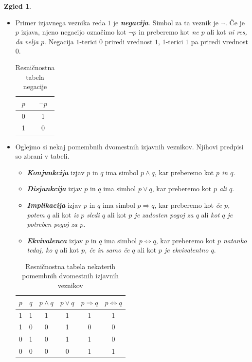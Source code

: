 \documentclass[11pt]{book}
\def\definicija{\color{rdeca}\bf\em}
\theoremstyle{definition}
\theoremstyle{zgled}
\newtheorem*{zgled}{Zgled}
\theoremstyle{odprtproblem}
\theoremstyle{domacanaloga}
\theoremstyle{izrek}
\begin{document}
\begin{zgled} \leavevmode
\begin{itemize}
    \item Primer izjavnega veznika reda $1$ je {\definicija negacija}. Simbol za ta veznik je $\lnot$. Če je $p$ izjava, njeno negacijo označimo kot $\lnot p$ in preberemo kot \emph{ne $p$} ali kot \emph{ni res, da velja $p$}. Negacija $1$-terici $0$ priredi vrednost $1$, $1$-terici $1$ pa priredi vrednost $0$.
    
    \begin{table}[h]
        \centering
        \begin{tabular}{c|c}
            $p$ & $\lnot p$ \\ \hline
            0 & 1 \\
            1 & 0
        \end{tabular}
        \caption{Resničnostna tabela negacije}
    \end{table}

    \item Oglejmo si nekaj pomembnih dvomestnih izjavnih veznikov. Njihovi predpisi so zbrani v tabeli.
    \begin{itemize}
        \item {\definicija Konjunkcija} izjav $p$ in $q$ ima simbol $p \land q$, kar preberemo kot \emph{$p$ in $q$}.
        \item {\definicija Disjunkcija} izjav $p$ in $q$ ima simbol $p \lor q$, kar preberemo kot \emph{$p$ ali $q$}.
        \item {\definicija Implikacija} izjav $p$ in $q$ ima simbol $p \Rightarrow q$, kar preberemo kot \emph{če $p$, potem $q$} ali kot \emph{iz $p$ sledi $q$} ali kot \emph{$p$ je zadosten pogoj za $q$} ali \emph{kot $q$ je potreben pogoj za $p$}.
        \item {\definicija Ekvivalenca} izjav $p$ in $q$ ima simbol $p \Leftrightarrow q$, kar preberemo kot \emph{$p$ natanko tedaj, ko $q$} ali kot \emph{$p$, če in samo če $q$} ali kot \emph{$p$ je ekvivalentno $q$}.
    \end{itemize}

    \begin{table}[h]
        \centering
        \begin{tabular}{cc|cccc}
            $p$ & $q$ & $p \land q$ & $p \lor q$ & $p \Rightarrow q$ & $p \Leftrightarrow q$ \\ \hline
            1 & 1 & 1 & 1 & 1 & 1 \\
            1 & 0 & 0 & 1 & 0 & 0 \\
            0 & 1 & 0 & 1 & 1 & 0 \\
            0 & 0 & 0 & 0 & 1 & 1
        \end{tabular}
        \caption{Resničnostna tabela nekaterih pomembnih dvomestnih izjavnih veznikov}
    \end{table}


\end{itemize}
\end{zgled}
\end{document}
